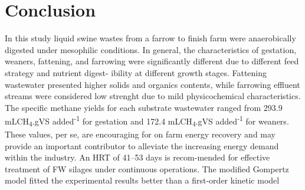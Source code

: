 \section{Conclusion}
In this study liquid swine wastes from a farrow to finish farm were anaerobically digested under mesophilic conditions. In general, the characteristics of gestation, weaners, fattening, and farrowing were significantly different due to different feed strategy and nutrient digest- ibility at different growth stages. Fattening wastewater presented higher solids and organics contents, while farrowing effluent streams were considered low strenght due to mild physicochemical characteristics. The specific methane yields for each substrate wastewater ranged from 293.9 mLCH\textsubscript{4}.gVS added\textsuperscript{-1} for gestation and 172.4 mLCH\textsubscript{4}.gVS added\textsuperscript{-1} for weaners.  These values, per se, are encouraging for on farm energy recovery and may provide an important contributor to alleviate the increasing energy demand within the industry. An HRT of 41–53 days is recom-mended for effective treatment of FW silages under continuous operations. The modified Gompertz model fitted the experimental results better than a first-order kinetic model